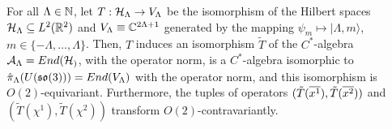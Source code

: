 \begin{theorem}\label{theoremUso3ViewAlternativeAlgebraO2IsomorphismD2}
For all $\Lambda \in \mathbb{N}$, let $T: \mathcal H_\Lambda \to V_\Lambda$ be the isomorphism of the Hilbert spaces $\mathcal H_\Lambda \subseteq L^2(\mathbb{R}^2)$ and $V_\Lambda \equiv \mathbb{C}^{2\Lambda + 1}$ generated by the mapping $\psi_m \mapsto |\Lambda, m\rangle$, $m \in \{-\Lambda, \dots, \Lambda\}$. Then, $T$ induces an isomorphism $\tilde T$ of the $C^*$-algebra $\mathcal A_\Lambda = End(\mathcal H_)$, with the operator norm, is a $C^*$-algebra isomorphic to $\hat \pi_\Lambda(U(\mathfrak{so}(3))) = End(V_\Lambda)$ with the operator norm, and this isomorphism is $O(2)$-equivariant. Furthermore, the tuples of operators $(\tilde T(\overline{x^1}), \tilde T(\overline{x^2}))$ and $(\tilde T(\chi^1), \tilde T(\chi^2))$ transform $O(2)$-contravariantly.
\end{theorem}

